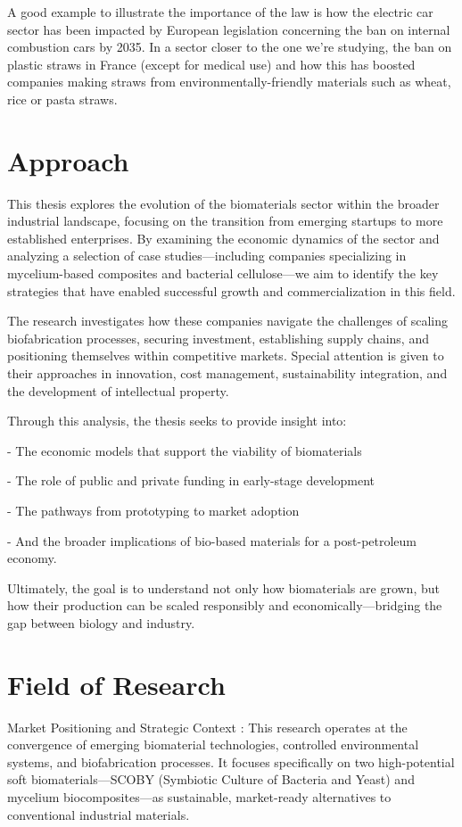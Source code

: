 A good example to illustrate the importance of the law is how the electric car sector has been impacted by European legislation concerning the ban on internal combustion cars by 2035. 
In a sector closer to the one we're studying, the ban on plastic straws in France (except for medical use) and how this has boosted companies making straws from environmentally-friendly materials such as wheat, rice or pasta straws.

\section{Approach}

This thesis explores the evolution of the biomaterials sector within the broader industrial landscape, focusing on the transition from emerging startups to more established enterprises. By examining the economic dynamics of the sector and analyzing a selection of case studies—including companies specializing in mycelium-based composites and bacterial cellulose—we aim to identify the key strategies that have enabled successful growth and commercialization in this field.

The research investigates how these companies navigate the challenges of scaling biofabrication processes, securing investment, establishing supply chains, and positioning themselves within competitive markets. Special attention is given to their approaches in innovation, cost management, sustainability integration, and the development of intellectual property.

Through this analysis, the thesis seeks to provide insight into:

- The economic models that support the viability of biomaterials

- The role of public and private funding in early-stage development

- The pathways from prototyping to market adoption

- And the broader implications of bio-based materials for a post-petroleum economy.

Ultimately, the goal is to understand not only how biomaterials are grown, but how their production can be scaled responsibly and economically—bridging the gap between biology and industry.

\section{Field of Research}


Market Positioning and Strategic Context : This research operates at the convergence of emerging biomaterial technologies, controlled environmental systems, and biofabrication processes. It focuses specifically on two high-potential soft biomaterials—SCOBY (Symbiotic Culture of Bacteria and Yeast) and mycelium biocomposites—as sustainable, market-ready alternatives to conventional industrial materials.

